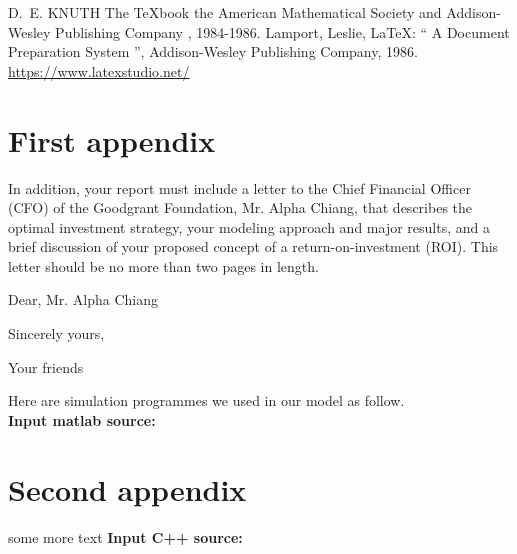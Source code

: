 \documentclass{mcmthesis}
\begin{document}
\begin{thebibliography}{99}
 D.~E. KNUTH   The \TeX{}book  the American
Mathematical Society and Addison-Wesley
Publishing Company , 1984-1986.
Lamport, Leslie,  \LaTeX{}: `` A Document Preparation System '',
Addison-Wesley Publishing Company, 1986.
\url{https://www.latexstudio.net/}
\end{thebibliography}

\begin{appendices}

\section{First appendix}

In addition, your report must include a letter to the Chief Financial Officer (CFO) of the Goodgrant Foundation, Mr. Alpha Chiang, that describes the optimal investment strategy, your modeling approach and major results, and a brief discussion of your proposed concept of a return-on-investment (ROI). This letter should be no more than two pages in length.







\begin{letter}{Dear, Mr. Alpha Chiang}

\vspace{\parskip}

Sincerely yours,

Your friends

\end{letter}
Here are simulation programmes we used in our model as follow.\\

\textbf{\textcolor[rgb]{0.98,0.00,0.00}{Input matlab source:}}


\section{Second appendix}

some more text \textcolor[rgb]{0.98,0.00,0.00}{\textbf{Input C++ source:}}


\end{appendices}
\end{document}
